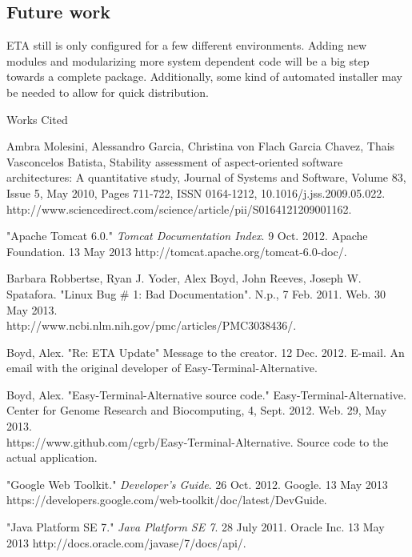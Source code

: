 \documentclass[a4paper,12pt]{article}
\newcommand{\bibent}{\noindent \hangindent 40pt}
\newenvironment{workscited}{ \doublespacing \newpage \begin{center} Works Cited \end{center}}{\newpage }
\begin{document}
\subsection{Future work}
 ETA still is only configured for a few different environments. Adding new modules and modularizing more system dependent code will be a big step towards a complete package. Additionally, some kind of automated installer may be needed to allow for quick distribution. 


\setlength{\parindent}{0.5in}

\begin{workscited}

  \bibent
 Ambra Molesini, Alessandro Garcia, Christina von Flach Garcia Chavez, Thais Vasconcelos Batista, Stability assessment of aspect-oriented software architectures: A quantitative study, Journal of Systems and Software, Volume 83, Issue 5, May 2010, Pages 711-722, ISSN 0164-1212, 10.1016/j.jss.2009.05.022.
\\http://www.sciencedirect.com/science/article/pii/S0164121209001162. 

 \bibent
 "Apache Tomcat 6.0." \textit{Tomcat Documentation Index}. 9 Oct. 2012. Apache Foundation.  13 May 2013 http://tomcat.apache.org/tomcat-6.0-doc/. 
 
  \bibent
 Barbara Robbertse, Ryan J. Yoder, Alex Boyd, John Reeves, Joseph W. Spatafora. "Linux Bug \# 1: Bad Documentation". N.p., 7 Feb. 2011. Web. 30 May 2013.\\ 
http://www.ncbi.nlm.nih.gov/pmc/articles/PMC3038436/.

   \bibent
   Boyd, Alex. "Re: ETA Update" Message to the creator. 12 Dec. 2012. E-mail. An email with the original developer of Easy-Terminal-Alternative.
   
 \bibent
 Boyd, Alex. "Easy-Terminal-Alternative source code." Easy-Terminal-Alternative. Center for Genome Research and Biocomputing, 4, Sept. 2012. Web. 29, May 2013. 
\\https://www.github.com/cgrb/Easy-Terminal-Alternative. Source code to the actual application.

 \bibent
 "Google Web Toolkit." \textit{Developer's Guide}. 26 Oct. 2012. Google. 13 May 2013 \\https://developers.google.com/web-toolkit/doc/latest/DevGuide. 

 \bibent
 "Java Platform SE 7." \textit{Java Platform SE 7}. 28 July 2011. Oracle Inc. 13 May 2013 http://docs.oracle.com/javase/7/docs/api/. 



\end{workscited}
\end{document}
